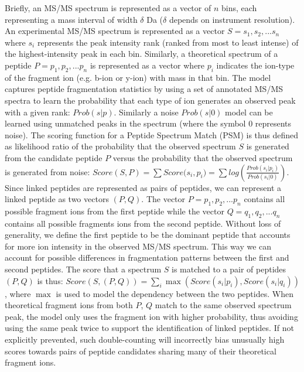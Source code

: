 \documentclass[arial,11pt]{article}
\begin{document}
Briefly, an MS/MS spectrum is represented as a vector of $n$ bins, each representing a mass interval of width $\delta$ Da ($\delta$ depends on instrument resolution).  An experimental MS/MS spectrum is represented as a vector $S = s_{1}, s_{2}, ... s_{n}$ where $s_{i}$ represents the peak intensity rank (ranked from most to least intense) of the highest-intensity peak in each bin.  Similarly, a theoretical spectrum of a peptide $P = p_{1}, p_{2}, ... p_{n}$ is represented as a vector where $p_{i}$ indicates the ion-type of the fragment ion (e.g. b-ion or y-ion) with mass in that bin.  The model captures peptide fragmentation statistics by using a set of annotated MS/MS spectra to learn the probability that each type of ion generates an observed peak with a given rank: $Prob(s|p)$.  Similarly a noise $Prob(s|0)$ model can be learned using unmatched peaks in the spectrum (where the symbol $0$ represents noise). The scoring function for a Peptide Spectrum Match (PSM) is thus defined as likelihood ratio of the probability that the observed spectrum $S$ is generated from the candidate peptide $P$ versus the probability that the observed spectrum is generated from noise: $Score(S,P)=\sum{Score(s_{i}}, p_{i})=\sum{log(\frac{Prob(s_{i}|p_{i})}{Prob(s_{i}|0)})}$. Since linked peptides are represented as pairs of peptides, we can represent a linked peptide as two vectors $(P, Q)$. The vector $P = p_{1}, p_{2}, ... p_{n}$ contains all possible fragment ions from the first peptide while the vector $Q = q_{1}, q_{2}, ... q_{n}$ contains all possible fragments ions from the second peptide.  Without loss of generality, we define the first peptide to be the dominant peptide that accounts for more ion intensity in the observed MS/MS spectrum.  This way we can account for possible differences in fragmentation patterns between the first and second peptides.  The score that a spectrum $S$ is matched to a pair of peptides $(P,Q)$ is thus: $Score(S,(P,Q)) = \sum_i{\max(Score(s_{i}|p_{i}), Score(s_{i}|q_{i}))}$, where $\max$ is used to model the dependency between the two peptides. When theoretical fragment ions from both $P$, $Q$ match to the same observed spectrum peak, the model only uses the fragment ion with higher probability, thus avoiding using the same peak twice to support the identification of linked peptides. If not explicitly prevented, such double-counting will incorrectly bias unusually high scores towards pairs of peptide candidates sharing many of their theoretical fragment ions.
\end{document}
